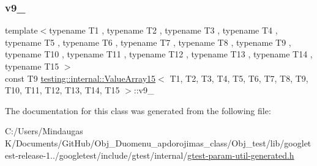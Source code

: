 \mbox{\label{classtesting_1_1internal_1_1_value_array15_a121d12c2e1cd4420e47e4523ac81797d}} 
\subsubsection{\texorpdfstring{v9\_}{v9\_}}
{\footnotesize\ttfamily template$<$typename T1 , typename T2 , typename T3 , typename T4 , typename T5 , typename T6 , typename T7 , typename T8 , typename T9 , typename T10 , typename T11 , typename T12 , typename T13 , typename T14 , typename T15 $>$ \\
const T9 \mbox{\hyperlink{classtesting_1_1internal_1_1_value_array15}{testing\+::internal\+::\+Value\+Array15}}$<$ T1, T2, T3, T4, T5, T6, T7, T8, T9, T10, T11, T12, T13, T14, T15 $>$\+::v9\+\_\+\hspace{0.3cm}{\ttfamily [private]}}



The documentation for this class was generated from the following file\+:\begin{DoxyCompactItemize}
\item 
C\+:/\+Users/\+Mindaugas K/\+Documents/\+Git\+Hub/\+Obj\+\_\+\+Duomenu\+\_\+apdorojimas\+\_\+class/\+Obj\+\_\+test/lib/googletest-\/release-\/1../googletest/include/gtest/internal/\mbox{\hyperlink{gtest-param-util-generated_8h}{gtest-\/param-\/util-\/generated.\+h}}\end{DoxyCompactItemize}

